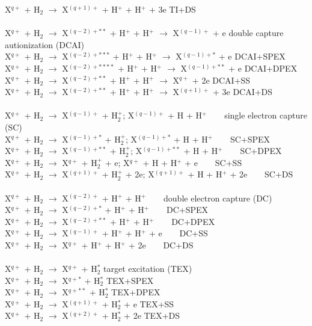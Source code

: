 \documentclass[draft]{agujournal2018}
\begin{document}
\begin{tabbing}
\> X$^{q+}$ + H$_2$ $\rightarrow$ X$^{(q+1)+}$ + H$^+$ + H$^+$ + 3e  \>  \> TI+DS \\
\\
\> X$^{q+}$ + H$_2$ $\rightarrow$ X$^{(q-2)+**}$ + H$^+$ + H$^+$ $\rightarrow$ X$^{(q-1)+}$ + e  \>  \> double capture autionization (DCAI) \\
\> X$^{q+}$ + H$_2$ $\rightarrow$ X$^{(q-2)+***}$ + H$^+$ + H$^+$ $\rightarrow$ X$^{(q-1)+*}$ + e  \>  \> DCAI+SPEX \\
\> X$^{q+}$ + H$_2$ $\rightarrow$ X$^{(q-2)+****}$ + H$^+$ + H$^+$ $\rightarrow$ X$^{(q-1)+**}$ + e  \>  \> DCAI+DPEX \\
\> X$^{q+}$ + H$_2$ $\rightarrow$ X$^{(q-2)+**}$ + H$^+$ + H$^+$ $\rightarrow$ X$^{q+}$ + 2e  \>  \> DCAI+SS \\
\> X$^{q+}$ + H$_2$ $\rightarrow$ X$^{(q-2)+**}$ + H$^+$ + H$^+$ $\rightarrow$ X$^{(q+1)+}$ + 3e  \>  \> DCAI+DS \\
\\
\> X$^{q+}$ + H$_2$ $\rightarrow$ X$^{(q-1)+}$ + H$_2^+$;  X$^{(q-1)+}$ + H + H$^+$ \> $\;\;\;\;\;$ \> single electron capture (SC) \\
\> X$^{q+}$ + H$_2$ $\rightarrow$ X$^{(q-1)+*}$ + H$_2^+$;  X$^{(q-1)+*}$ + H + H$^+$ \> $\;\;\;\;\;$ \> SC+SPEX \\
\> X$^{q+}$ + H$_2$ $\rightarrow$ X$^{(q-1)+**}$ + H$_2^+$;  X$^{(q-1)+**}$ + H + H$^+$ \> $\;\;\;\;\;$ \> SC+DPEX \\
\> X$^{q+}$ + H$_2$ $\rightarrow$ X$^{q+}$ + H$_2^+$ + e;  X$^{q+}$ + H + H$^+$ + e \> $\;\;\;\;\;$ \> SC+SS \\
\> X$^{q+}$ + H$_2$ $\rightarrow$ X$^{(q+1)+}$ + H$_2^+$ + 2e;  X$^{(q+1)+}$ + H + H$^+$ + 2e \> $\;\;\;\;\;$ \> SC+DS \\
\\
\> X$^{q+}$ + H$_2$ $\rightarrow$ X$^{(q-2)+}$ + H$^+$ + H$^+$ \> $\;\;\;\;\;$ \> double electron capture (DC) \\
\> X$^{q+}$ + H$_2$ $\rightarrow$ X$^{(q-2)+*}$ + H$^+$ + H$^+$ \> $\;\;\;\;\;$ \> DC+SPEX \\
\> X$^{q+}$ + H$_2$ $\rightarrow$ X$^{(q-2)+**}$ + H$^+$ + H$^+$ \> $\;\;\;\;\;$ \> DC+DPEX \\
\> X$^{q+}$ + H$_2$ $\rightarrow$ X$^{(q-1)+}$ + H$^+$ + H$^+$ + e \> $\;\;\;\;\;$ \> DC+SS \\
\> X$^{q+}$ + H$_2$ $\rightarrow$ X$^{q+}$ + H$^+$ + H$^+$ + 2e \> $\;\;\;\;\;$ \> DC+DS \\
\\
\> X$^{q+}$ + H$_2$ $\rightarrow$ X$^{q+}$ + H$_2^*$  \> \> target excitation (TEX) \\
\> X$^{q+}$ + H$_2$ $\rightarrow$ X$^{q+*}$ + H$_2^*$  \> \> TEX+SPEX \\
\> X$^{q+}$ + H$_2$ $\rightarrow$ X$^{q+**}$ + H$_2^*$  \> \> TEX+DPEX \\
\> X$^{q+}$ + H$_2$ $\rightarrow$ X$^{(q+1)+}$ + H$_2^*$ + e  \> \> TEX+SS \\
\> X$^{q+}$ + H$_2$ $\rightarrow$ X$^{(q+2)+}$ + H$_2^*$ + 2e \> \> TEX+DS
\end{tabbing}
\end{document}
